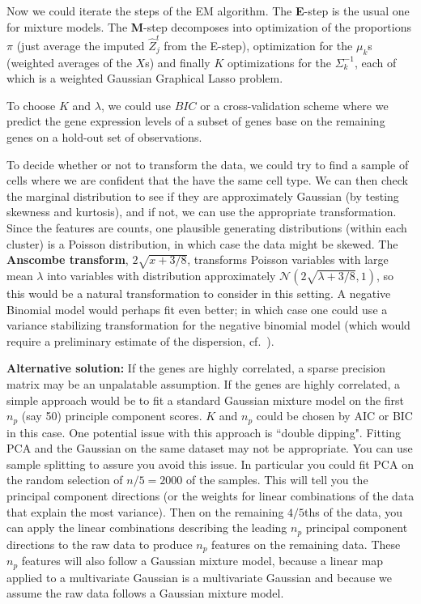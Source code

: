 \begin{enumerate}[label=(\alph*)]
  Now we could iterate the steps of the EM algorithm. The \textbf{E}-step is the usual one for mixture models. The \textbf{M}-step decomposes into optimization of the proportions $\pi$ (just average the imputed $\hat{Z}_j^t$ from the E-step), optimization for the $\mu_k$s  (weighted averages of the $X$s) and finally $K$ optimizations for the $\Sigma_k^{-1}$, each of which is a weighted Gaussian Graphical Lasso problem.  


  To choose $K$ and $\lambda$, we could use $BIC$ or a cross-validation scheme where we predict the gene expression levels of a subset of genes base on the remaining genes on a hold-out set of observations.


  To decide whether or not to transform the data, we could try to find a sample of cells where we are confident that the have the same cell type. We can then check the marginal distribution to see if they are approximately Gaussian (by testing skewness and kurtosis), and if not, we can use the appropriate transformation. Since the features are counts, one plausible generating distributions (within each cluster) is a Poisson distribution, in which case the data might be skewed. The {\bf Anscombe transform}, $2 \sqrt{x + 3/8}$, transforms Poisson variables with large mean $\lambda$ into variables with distribution approximately $\mathcal{N}(2 \sqrt{\lambda + 3/8}, 1)$, so this would be a natural transformation to consider in this setting. A negative Binomial model would perhaps fit even better; in which case one could use a variance stabilizing transformation for the negative binomial model (which would require a preliminary estimate of the dispersion, cf.~\citet{anders2010differential}).

\textbf{Alternative solution:} If the genes are highly correlated, a sparse precision matrix may be an unpalatable assumption. If the genes are highly correlated, a simple approach would be to fit a standard Gaussian mixture model on the first $n_p$ (say 50) principle component scores. $K$ and $n_p$ could be chosen by AIC or BIC in this case. One potential issue with this approach is ``double dipping". Fitting PCA and the Gaussian on the same dataset may not be appropriate. You can use sample splitting to assure you avoid this issue. In particular you could fit PCA on the random selection of $n/5=2000$ of the samples. This will tell you the principal component directions (or the weights for linear combinations of the data that explain the most variance). Then on the remaining $4/5$ths of the data, you can apply the linear combinations describing the leading $n_p$ principal component directions to the raw data to produce $n_p$ features on the remaining data. These $n_p$ features will also follow a Gaussian mixture model, because a linear map applied to a multivariate Gaussian is a multivariate Gaussian and because we assume the raw data follows a Gaussian mixture model.


\end{enumerate}
